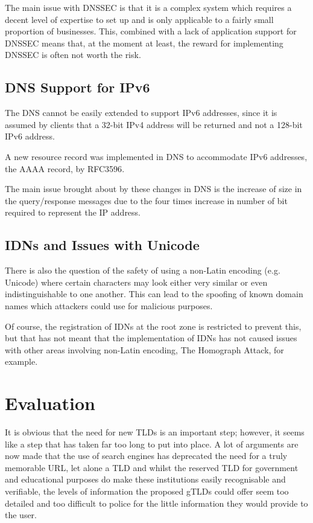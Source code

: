 \documentclass[11pt, a4paper]{article}
\begin{document}
The main issue with \gls{DNSSEC} is that it is a complex system which requires
a decent level of expertise to set up and is only applicable to a fairly small
proportion of businesses. This, combined with a lack of application support for
\gls{DNSSEC} means that, at the moment at least, the reward for implementing
\gls{DNSSEC} is often not worth the risk\cite{rasmussen2011risk}.

\subsection{DNS Support for IPv6}
\label{subsec:dnsipv6}

The \gls{DNS} cannot be easily extended to support IPv6 addresses, since it is
assumed by clients that a 32-bit IPv4 address will be returned and not a 128-bit
IPv6 address.

A new resource record was implemented in \gls{DNS} to accommodate IPv6 
addresses, the AAAA record, by RFC3596\cite{rfc3596}.

The main issue brought about by these changes in \gls{DNS} is the increase of
size in the query/response messages due to the four times increase in number of
bit required to represent the IP address.

\subsection{IDNs and Issues with Unicode}
There is also the question of the safety of using a non-Latin encoding
(e.g. Unicode) where certain characters may look either very similar or even
indistinguishable to one another\cite{kaufman2013unicode}. This can lead to the
spoofing of known domain names which attackers could use for malicious purposes.

Of course, the registration of \glspl{IDN} at the root zone is restricted to
prevent this\cite{icann2011idns}, but that has not meant that the implementation of \glspl{IDN} has
not caused issues with other areas involving non-Latin encoding, The Homograph 
Attack\cite{gabrilovich2002homograph}, for example.


\newpage
\section{Evaluation}

It is obvious that the need for new \glspl{TLD} is an important step; however, 
it seems like a step that has taken far too long to put into place. A lot of
arguments are now made that the use of search engines has deprecated the need
for a truly memorable \gls{URL}, let alone a \gls{TLD} and whilst the reserved
\gls{TLD} for government and educational purposes do make these institutions
easily recognisable and verifiable, the levels of information the proposed 
\glspl{gTLD} could offer seem too detailed and too difficult to police for the
little information they would provide to the user.
\end{document}
